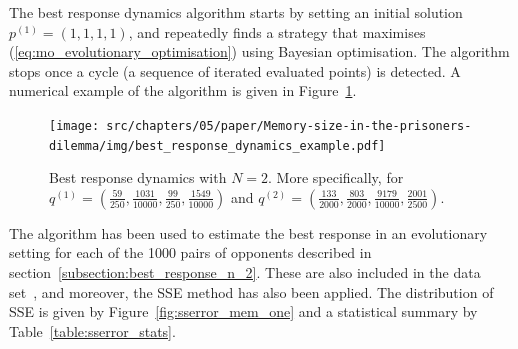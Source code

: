 The best response dynamics algorithm starts by setting an initial
solution \(p^{(1)}=(1, 1, 1, 1)\), and repeatedly finds a strategy that maximises
(\ref{eq:mo_evolutionary_optimisation}) using Bayesian optimisation. The
algorithm stops once a cycle (a sequence of iterated evaluated points) is
detected. A numerical example of the algorithm is given in Figure~\ref{fig:best_response_dynamics_results}.

\begin{figure}[!htbp]
    \centering
    \texttt{[image: src/chapters/05/paper/Memory-size-in-the-prisoners-dilemma/img/best\_response\_dynamics\_example.pdf]}
    \caption{Best response dynamics with \(N=2\). More specifically, for
    \(q ^{(1)}=(\frac{59}{250},
                \frac{1031}{10000},
                \frac{99}{250},
                \frac{1549}{10000})\) and
    \(q ^{(2)}=(\frac{133}{2000},
                \frac{803}{2000},
                \frac{9179}{10000},
                \frac{2001}{2500})\).}
\label{fig:best_response_dynamics_results}
\end{figure}

The algorithm has been used to estimate the best response in an evolutionary
setting for each of the 1000 pairs of opponents described in
section~\ref{subsection:best_response_n_2}. These are also included in the data
set~\cite{glynatsi2019}, and moreover, the SSE method has also been applied. The
distribution of SSE is given by Figure~\ref{fig:sserror_mem_one} and a
statistical summary by Table~\ref{table:sserror_stats}.

